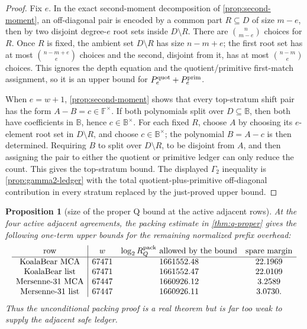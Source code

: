 \documentclass[a4paper,11pt]{amsart}
\newtheorem{proposition}[proposition]{Proposition}
\theoremstyle{remark}
\newcommand{\F}{\mathbb F}
\newcommand{\B}{\mathbb B}
\begin{document}
\begin{proof}
Fix \(e\).  In the exact second-moment decomposition of \cref{prop:second-moment}, an off-diagonal pair is encoded by a common part \(R\subseteq D\) of size \(m-e\), then by two disjoint degree-\(e\) root sets inside \(D\setminus R\).  There are \(\binom n{m-e}\) choices for \(R\).  Once \(R\) is fixed, the ambient set \(D\setminus R\) has size \(n-m+e\); the first root set has at most \(\binom{n-m+e}{e}\) choices and the second, disjoint from it, has at most \(\binom{n-m}{e}\) choices.  This ignores the depth equation and the quotient/primitive first-match assignment, so it is an upper bound for \(P_e^{\rm quot}+P_e^{\rm prim}\).

When \(e=w+1\), \cref{prop:second-moment} shows that every top-stratum shift pair has the form \(A-B=c\in\F^\times\).  If both polynomials split over \(D\subseteq\B\), then both have coefficients in \(\B\), hence \(c\in\B^\times\).  For each fixed \(R\), choose \(A\) by choosing its \(e\)-element root set in \(D\setminus R\), and choose \(c\in\B^\times\); the polynomial \(B=A-c\) is then determined.  Requiring \(B\) to split over \(D\setminus R\), to be disjoint from \(A\), and then assigning the pair to either the quotient or primitive ledger can only reduce the count.  This gives the top-stratum bound.  The displayed \(\Gamma_2\) inequality is \cref{prop:gamma2-ledger} with the total quotient-plus-primitive off-diagonal contribution in every stratum replaced by the just-proved upper bound.
\end{proof}

\begin{proposition}[size of the proper Q bound at the active adjacent rows]\label{prop:proper-q-gap}
At the four active adjacent agreements, the packing estimate in \cref{thm:q-proper} gives the following one-term upper bounds for the remaining normalized prefix overhead:
\[
\begin{array}{c|ccc}
\text{row} & w & \log_2 R_Q^{\rm pack}\text{ allowed by the bound} & \text{spare margin}\\
\hline
\text{KoalaBear MCA} & 67471 & 1661552.48 & 22.1969\\
\text{KoalaBear list} & 67471 & 1661552.47 & 22.0109\\
\text{Mersenne-31 MCA} & 67447 & 1660926.12 & 3.2589\\
\text{Mersenne-31 list} & 67447 & 1660926.11 & 3.0730 .
\end{array}
\]
Thus the unconditional packing proof is a real theorem but is far too weak to supply the adjacent safe ledger.
\end{proposition}
\end{document}
